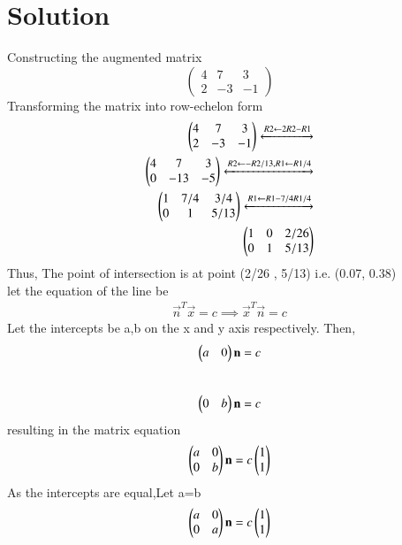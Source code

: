 \documentclass[journal,12pt,twocolumn]{IEEEtran}
\begin{document}
\section{Solution}
\begin{flushleft}
Constructing the augmented matrix \\
$$
\begin{pmatrix}
    4 & 7 & 3 \\ 
    2 & -3 & -1
\end{pmatrix}
$$
Transforming the matrix into row-echelon form \\
\begin{align}
\begin{pmatrix}
4 & 7 & 3 \\
2 & -3 & -1
\end{pmatrix}
  \xleftrightarrow[]{R2 \leftarrow 2R2 - R1 } \nonumber \\
\begin{pmatrix}
4 & 7 & 3 \\
0 & -13 & -5
\end{pmatrix}
\xleftrightarrow[]{R2 \leftarrow -R2/13,R1 \leftarrow R1/4} \nonumber \\
\begin{pmatrix}
1 & 7/4 & 3/4 \\
0 & 1 & 5/13
\end{pmatrix}
\xleftrightarrow[]{R1 \leftarrow R1-7/4R1/4} \nonumber \\
\begin{pmatrix}
1 & 0 & 2/26 \\
0 & 1 & 5/13
\end{pmatrix}
\end{align}
Thus, The point of intersection is at point (2/26 , 5/13) i.e. (0.07, 0.38)\\
let the equation of the line be
\begin{align}
\vec{n}^T\vec{x} = c \implies \vec{x}^T\vec{n} = c
\end{align}
Let the intercepts be a,b on the x and y axis respectively. Then,
\begin{align} 
\begin{pmatrix}a & 0\end{pmatrix}\mathbf{n} = c
\end{align}
\\
\begin{align} 
\begin{pmatrix}0 & b\end{pmatrix}\mathbf{n} = c
\end{align}
resulting in the matrix equation
\begin{equation}
\begin{pmatrix}a & 0 \\ 0 & b\end{pmatrix}\mathbf{n} = c \begin{pmatrix}1 \\ 1\end{pmatrix}
\end{equation}
As the intercepts are equal,Let a=b
\begin{equation}
\begin{pmatrix}a & 0 \\ 0 & a\end{pmatrix}\mathbf{n} = c \begin{pmatrix}1 \\ 1\end{pmatrix}
\end{equation}
\begin{equation}

\end{equation}
\end{flushleft}
\end{document}
